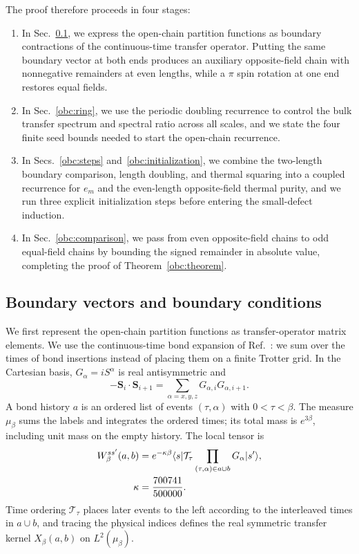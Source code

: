 The proof therefore proceeds in four stages:
\begin{enumerate}
 \item In Sec.~\ref{obc:caps}, we express the open-chain partition functions as boundary contractions of the continuous-time transfer operator. Putting the same boundary vector at both ends produces an auxiliary opposite-field chain with nonnegative remainders at even lengths, while a $\pi$ spin rotation at one end restores equal fields.
 \item In Sec.~\ref{obc:ring}, we use the periodic doubling recurrence to control the bulk transfer spectrum and spectral ratio across all scales, and we state the four finite seed bounds needed to start the open-chain recurrence.
 \item In Secs.~\ref{obc:steps} and~\ref{obc:initialization}, we combine the two-length boundary comparison, length doubling, and thermal squaring into a coupled recurrence for $e_m$ and the even-length opposite-field thermal purity, and we run three explicit initialization steps before entering the small-defect induction.
 \item In Sec.~\ref{obc:comparison}, we pass from even opposite-field chains to odd equal-field chains by bounding the signed remainder in absolute value, completing the proof of Theorem~\ref{obc:theorem}.
\end{enumerate}

\subsection{Boundary vectors and boundary conditions}
\label{obc:caps}

We first represent the open-chain partition functions as transfer-operator
matrix elements. We use the continuous-time bond expansion of
Ref.~\cite{OpenAI2026Boundaryfield}: we sum over the times of bond
insertions instead of placing them on a finite Trotter grid.
In the Cartesian basis, $G_\alpha=iS^\alpha$ is real antisymmetric and
\[
 -\bm S_i\cdot\bm S_{i+1}
 =\sum_{\alpha=x,y,z}G_{\alpha,i}G_{\alpha,i+1}.
\]
A bond history $a$ is an ordered list of events $(\tau,\alpha)$ with
$0<\tau<\beta$. The measure $\mu_\beta$ sums the labels and integrates
the ordered times; its total mass is $e^{3\beta}$, including unit mass
on the empty history. The local tensor is
\begin{align}
 W_\beta^{ss'}(a,b)
 &=e^{-\kappa\beta}
 \langle s|\mathcal T_\tau
 \prod_{(\tau,\alpha)\in a\cup b}G_\alpha|s'\rangle,\notag \\
 \kappa&=\frac{700741}{500000}.
 \label{obc:local}
\end{align}
Time ordering $\mathcal T_\tau$ places later events to the left
according to the interleaved times in $a\cup b$, and tracing the
physical indices defines the real symmetric transfer kernel
$X_\beta(a,b)$ on $L^2(\mu_\beta)$.

